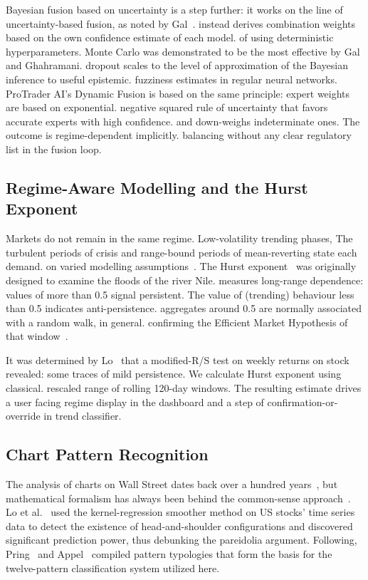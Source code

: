 \documentclass[10pt,a4paper,twoside]{article}
\begin{document}
Bayesian fusion based on uncertainty is a step further: it works on the line of uncertainty-based fusion, as noted by Gal~\cite{gal2016}.
instead derives combination weights based on the own confidence estimate of each model.
of using deterministic hyperparameters. Monte Carlo was demonstrated to be the most effective by Gal and Ghahramani.
dropout scales to the level of approximation of the Bayesian inference to useful epistemic.
fuzziness estimates in regular neural networks. ProTrader AI's Dynamic
Fusion is based on the same principle: expert weights are based on exponential.
negative squared rule of uncertainty that favors accurate experts with high confidence.
and down-weighs indeterminate ones. The outcome is regime-dependent implicitly.
balancing without any clear regulatory list in the fusion loop.

\subsection{Regime-Aware Modelling and the Hurst Exponent}

Markets do not remain in the same regime. Low-volatility trending phases,
The turbulent periods of crisis and range-bound periods of mean-reverting state each demand.
on varied modelling assumptions~\cite{hamilton1989}. The Hurst
exponent~\cite{hurst1951} was originally designed to examine the floods of the river Nile.
measures long-range dependence: values of more than 0.5 signal persistent.
The value of (trending) behaviour less than 0.5 indicates anti-persistence.
aggregates around 0.5 are normally associated with a random walk, in general.
confirming the Efficient Market Hypothesis of that window~\cite{lo1991}.

It was determined by Lo~\cite{lo1991} that a modified-R/S test on weekly returns on stock revealed:
some traces of mild persistence. We calculate Hurst exponent using classical.
rescaled range of rolling 120-day windows. The resulting estimate
drives a user facing regime display in the dashboard and a
step of confirmation-or-override in trend classifier.

\subsection{Chart Pattern Recognition}

The analysis of charts on Wall Street dates back over a hundred years~\cite{murphy1999, edwards1948}, but mathematical formalism has always been behind the common-sense approach~\cite{lo2000}. Lo et al.~\cite{lo2000} used the kernel-regression smoother method on US stocks' time series data to detect the existence of head-and-shoulder configurations and discovered significant prediction power, thus debunking the pareidolia argument. Following, Pring~\cite{pring2002} and Appel~\cite{appel2005} compiled pattern typologies that form the basis for the twelve-pattern classification system utilized here.
\end{document}
